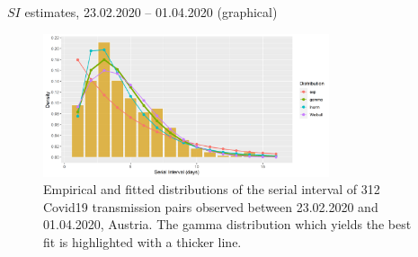 \documentclass[
  ignorenonframetext,
  aspectratio=169,
]{beamer}
\begin{document}
\begin{frame}{\(SI\) estimates, 23.02.2020 -- 01.04.2020 (graphical)}
\protect\hypertarget{si-estimates-23.02.2020-01.04.2020-graphical}{}
\begin{figure}
  \centering
  \includegraphics[width=0.75\textwidth,keepaspectratio]{img/fig2_fits_p1_2023-05-12.png}
  \caption{Empirical and fitted distributions of the serial interval of 312 Covid19 transmission pairs observed between 23.02.2020 and 01.04.2020, Austria. The gamma distribution which yields the best fit is highlighted with a thicker line.}
\end{figure}

\end{frame}
\end{document}
